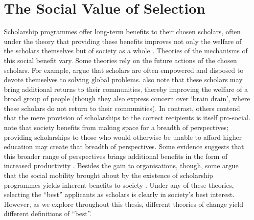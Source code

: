 \section{The Social Value of Selection}\label{sec:social_value}
Scholarship programmes offer long-term benefits to their chosen scholars, often under the theory that providing these benefits improves not only the welfare of the scholars themselves but of society as a whole \cite{DilraboJonbekova_Ruby_2023,Dassin_Marsh_Mawer_2018}. Theories of the mechanisms of this social benefit vary. Some theories rely on the future actions of the chosen scholars. For example, \textcite{Dassin_Marsh_Mawer_2018} argue that scholars are often empowered and disposed to devote themselves to solving global problems. \textcite{Dassin_Marsh_Mawer_2018} also note that these scholars may bring additional returns to their communities, thereby improving the welfare of a broad group of people (though they also express concern over `brain drain', where these scholars do not return to their communities). In contrast, others contend that the mere provision of scholarships to the correct recipients is itself pro-social. \textcite{minkin2023diversity} note that society benefits from making space for a breadth of perspectives; providing scholarships to those who would otherwise be unable to afford higher education may create that breadth of perspectives. Some evidence suggests that this broader range of perspectives brings additional benefits in the form of increased productivity \cite{autor2008does,noray2023systemic}. Besides the gain to organisations, though, some argue that the social mobility brought about by the existence of scholarship programmes yields inherent benefits to society \cite{Dassin_Marsh_Mawer_2018}. Under any of these theories, selecting the ``best'' applicants as scholars is clearly in society's best interest. However, as we explore throughout this thesis, different theories of change yield different definitions of ``best''.

